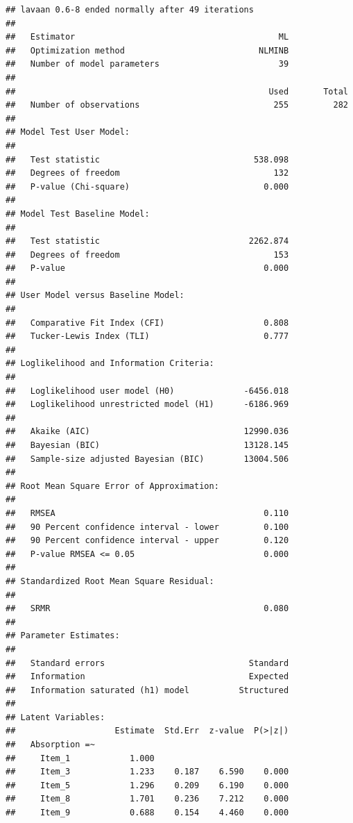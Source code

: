 \documentclass[
]{book}
\begin{document}
\begin{verbatim}
## lavaan 0.6-8 ended normally after 49 iterations
## 
##   Estimator                                         ML
##   Optimization method                           NLMINB
##   Number of model parameters                        39
##                                                       
##                                                   Used       Total
##   Number of observations                           255         282
##                                                                   
## Model Test User Model:
##                                                       
##   Test statistic                               538.098
##   Degrees of freedom                               132
##   P-value (Chi-square)                           0.000
## 
## Model Test Baseline Model:
## 
##   Test statistic                              2262.874
##   Degrees of freedom                               153
##   P-value                                        0.000
## 
## User Model versus Baseline Model:
## 
##   Comparative Fit Index (CFI)                    0.808
##   Tucker-Lewis Index (TLI)                       0.777
## 
## Loglikelihood and Information Criteria:
## 
##   Loglikelihood user model (H0)              -6456.018
##   Loglikelihood unrestricted model (H1)      -6186.969
##                                                       
##   Akaike (AIC)                               12990.036
##   Bayesian (BIC)                             13128.145
##   Sample-size adjusted Bayesian (BIC)        13004.506
## 
## Root Mean Square Error of Approximation:
## 
##   RMSEA                                          0.110
##   90 Percent confidence interval - lower         0.100
##   90 Percent confidence interval - upper         0.120
##   P-value RMSEA <= 0.05                          0.000
## 
## Standardized Root Mean Square Residual:
## 
##   SRMR                                           0.080
## 
## Parameter Estimates:
## 
##   Standard errors                             Standard
##   Information                                 Expected
##   Information saturated (h1) model          Structured
## 
## Latent Variables:
##                    Estimate  Std.Err  z-value  P(>|z|)
##   Absorption =~                                       
##     Item_1            1.000                           
##     Item_3            1.233    0.187    6.590    0.000
##     Item_5            1.296    0.209    6.190    0.000
##     Item_8            1.701    0.236    7.212    0.000
##     Item_9            0.688    0.154    4.460    0.000

\end{verbatim}
\end{document}
